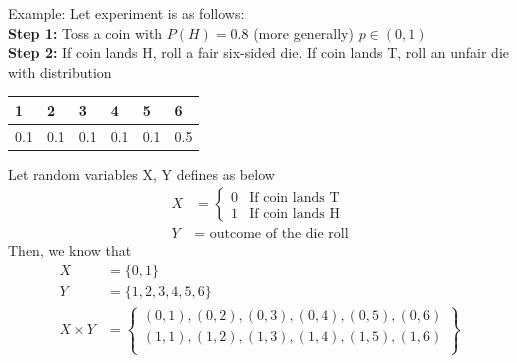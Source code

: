 \documentclass[11pt,oneside]{book}
\theoremstyle{break}
\theoremstyle{break}
\newcommand{\example}{\color{WildStrawberry}Example: \color{black}}
\begin{document}
\example Let experiment is as follows: \\
\text{\quad} \textbf{Step 1:} Toss a coin with $P(H)=0.8$ (more generally) $p\in (0,1)$\\
\text{\quad} \textbf{Step 2:} If coin lands H, roll a fair six-sided die. If coin lands T, roll an unfair die with distribution \begin{center}
\begin{tabular}{|l|l|l|l|l|l|}
\hline
1   & 2   & 3   & 4   & 5   & 6   \\ \hline
0.1 & 0.1 & 0.1 & 0.1 & 0.1 & 0.5 \\ \hline
\end{tabular}
\end{center}
Let random variables X, Y defines as below \begin{align*}
X&=\begin{cases}
0&\text{If coin lands T}\\
1&\text{If coin lands H}
\end{cases}\\
Y&=\text{ outcome of the die roll}
\end{align*}
Then, we know that \begin{align*}
X&=\{0,1\}\\
Y&=\{1,2,3,4,5,6\}\\
X\times Y&=\begin{Bmatrix}
(0,1),(0,2),(0,3),(0,4),(0,5),(0,6)\\
(1,1),(1,2),(1,3),(1,4),(1,5),(1,6)\\
\end{Bmatrix}
\end{align*}
\end{document}
